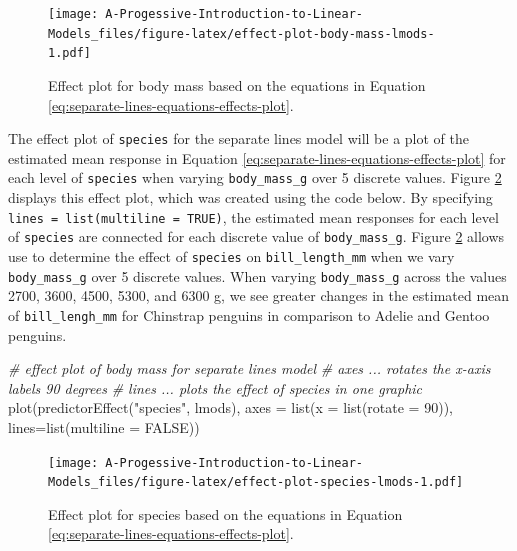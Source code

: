 \documentclass[
]{book}
\newenvironment{Shaded}{\begin{snugshade}}{\end{snugshade}}
\newcommand{\AttributeTok}[1]{\textcolor[rgb]{0.77,0.63,0.00}{#1}}
\newcommand{\CommentTok}[1]{\textcolor[rgb]{0.56,0.35,0.01}{\textit{#1}}}
\newcommand{\ConstantTok}[1]{\textcolor[rgb]{0.00,0.00,0.00}{#1}}
\newcommand{\DecValTok}[1]{\textcolor[rgb]{0.00,0.00,0.81}{#1}}
\newcommand{\FunctionTok}[1]{\textcolor[rgb]{0.00,0.00,0.00}{#1}}
\newcommand{\NormalTok}[1]{#1}
\newcommand{\StringTok}[1]{\textcolor[rgb]{0.31,0.60,0.02}{#1}}
\theoremstyle{definition}
\theoremstyle{definition}
\theoremstyle{definition}
\theoremstyle{definition}
\theoremstyle{remark}
\begin{document}
\begin{figure}
\centering
\texttt{[image: A-Progessive-Introduction-to-Linear-Models\_files/figure-latex/effect-plot-body-mass-lmods-1.pdf]}
\caption{\label{fig:effect-plot-body-mass-lmods}Effect plot for body mass based on the equations in Equation \eqref{eq:separate-lines-equations-effects-plot}.}
\end{figure}

The effect plot of \texttt{species} for the separate lines model will be a plot
of the estimated mean response in Equation
\eqref{eq:separate-lines-equations-effects-plot} for each level of
\texttt{species} when varying \texttt{body\_mass\_g} over 5 discrete values. Figure
\ref{fig:effect-plot-species-lmods} displays this effect plot, which
was created using the code below. By specifying
\texttt{lines\ =\ list(multiline\ =\ TRUE)}, the estimated mean responses for each
level of \texttt{species} are connected for each discrete value of
\texttt{body\_mass\_g}. Figure \ref{fig:effect-plot-species-lmods} allows use to
determine the effect of \texttt{species} on \texttt{bill\_length\_mm} when we vary
\texttt{body\_mass\_g} over 5 discrete values. When varying \texttt{body\_mass\_g} across
the values 2700, 3600, 4500, 5300, and 6300 g, we see greater changes in
the estimated mean of \texttt{bill\_lengh\_mm} for Chinstrap penguins in
comparison to Adelie and Gentoo penguins.

\begin{Shaded}
\begin{Highlighting}[]
\CommentTok{\# effect plot of body mass for separate lines model}
\CommentTok{\# axes ... rotates the x{-}axis labels 90 degrees}
\CommentTok{\# lines ... plots the effect of species in one graphic}
\FunctionTok{plot}\NormalTok{(}\FunctionTok{predictorEffect}\NormalTok{(}\StringTok{"species"}\NormalTok{, lmods),}
     \AttributeTok{axes =} \FunctionTok{list}\NormalTok{(}\AttributeTok{x =} \FunctionTok{list}\NormalTok{(}\AttributeTok{rotate =} \DecValTok{90}\NormalTok{)),}
     \AttributeTok{lines=}\FunctionTok{list}\NormalTok{(}\AttributeTok{multiline =} \ConstantTok{FALSE}\NormalTok{))}
\end{Highlighting}
\end{Shaded}

\begin{figure}
\centering
\texttt{[image: A-Progessive-Introduction-to-Linear-Models\_files/figure-latex/effect-plot-species-lmods-1.pdf]}
\caption{\label{fig:effect-plot-species-lmods}Effect plot for species based on the equations in Equation \eqref{eq:separate-lines-equations-effects-plot}.}
\end{figure}
\end{document}
